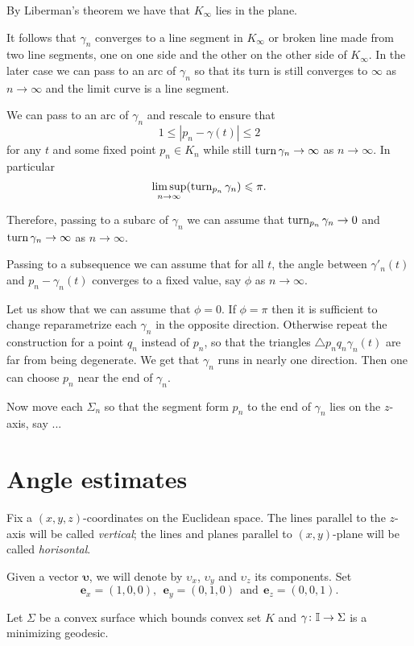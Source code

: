 \documentclass[a4paper,10pt]{amsart}
\begin{document}
By Liberman's theorem we have that $K_\infty$ lies in the plane.

It follows that $\gamma_n$ converges to a line segment in $K_\infty$
or broken line made from two line segments, one on one side and the other on the other side of $K_\infty$.
In the later case we can pass to an arc of $\gamma_n$ so that its turn is still converges to $\infty$ as $n\to\infty$ and the limit curve is a line segment.

We can pass to an arc of $\gamma_n$ and rescale to ensure that 
\[1\le|p_n-\gamma(t)|\le 2\] 
for any $t$ and some fixed point $p_n\in K_n$
while still $\mathop{\rm turn}\nolimits\gamma_n\to\infty$ as $n\to \infty$.
In particular 
\[\limsup_{n\to\infty}(\mathop{\rm turn}\nolimits_{p_n}\gamma_n)\leqslant \pi.\]

Therefore, passing to a subarc of $\gamma_n$ we can assume that 
$\mathop{\rm turn}\nolimits_{p_n}\gamma_n\to0$ and $\mathop{\rm turn}\nolimits\gamma_n\to\infty$ as $n\to\infty$.

Passing to a subsequence we can assume that for all $t$, 
the angle between $\gamma'_n(t)$ and $p_n-\gamma_n(t)$ 
converges to a fixed value, 
say $\phi$ 
as $n\to \infty$.

Let us show that we can assume that $\phi=0$.
If $\phi=\pi$ then it is sufficient to change reparametrize each $\gamma_n$ in the opposite direction.
Otherwise repeat the construction for a point $q_n$ instead of $p_n$, 
so that the triangles $\triangle p_nq_n\gamma_n(t)$ are far from being degenerate.
We get that $\gamma_n$ runs in nearly one direction.
Then one can choose $p_n$ near the end of $\gamma_n$.

Now move each $\Sigma_n$ so that the segment form $p_n$ to the end of $\gamma_n$ lies on the $z$-axis,
say ...


\qeds


\section{Angle estimates}

Fix a $(x,y,z)$-coordinates on the Euclidean space.
The lines parallel to the $z$-axis will be called \emph{vertical};
the lines and planes parallel to $(x,y)$-plane will be called \emph{horisontal}.

Given a vector $\bm{\upsilon}$, we will denote by $\upsilon_x$, $\upsilon_y$ and $\upsilon_z$ its components.
Set 
\[\bm{e}_x=(1,0,0),\ \ \bm{e}_y=(0,1,0)\ \ \text{and}\ \ \bm{e}_z=(0,0,1).\]

Let $\Sigma$ be a convex surface which bounds convex set $K$
and $\gamma\colon\mathbb{I}\to \Sigma$ is a minimizing geodesic.
\end{document}
